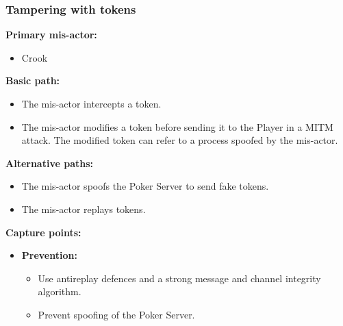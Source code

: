 \documentclass[a4paper,11pt]{report}
\begin{document}
\subsubsection{Tampering with tokens}
\label{PlayerFlowCasesT2}
\textbf{Primary mis-actor:}
\begin{itemize}
\item Crook
\end{itemize}
\textbf{Basic path:}
\begin{itemize}
\item The mis-actor intercepts a token.
\item The mis-actor modifies a token before sending it to the Player in a MITM attack. The modified token can refer to a process spoofed by the mis-actor.
\end{itemize}
\textbf{Alternative paths:}
\begin{itemize}
\item The mis-actor spoofs the Poker Server to send fake tokens.
\item The mis-actor replays tokens.
\end{itemize}
\textbf{Capture points:}
\begin{itemize}
\item \textbf{Prevention:}
\begin{itemize}
\item Use antireplay defences and a strong message and channel integrity algorithm.
\item Prevent spoofing of the Poker Server.
\end{itemize}
\end{itemize}
\end{document}
